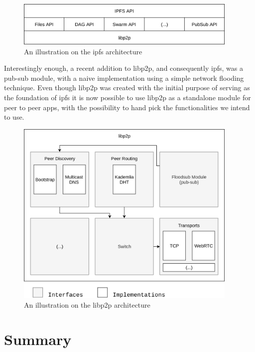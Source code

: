 \begin{figure}[hb!]
  \centering
  \includegraphics[width=0.95\textwidth]{../images/ipfs-stack.png}
  \caption{An illustration on the \acrshort{ipfs} architecture}
  \label{fig:ipfs-stack}
\end{figure}

Interestingly enough, a recent addition to libp2p, and consequently \acrshort{ipfs}, was a
pub-sub module, with a naive implementation using a simple network flooding
technique. Even though libp2p was created with the initial purpose of serving
as the foundation of \acrshort{ipfs} it is now possible to use libp2p as a standalone
module for peer to peer apps, with the possibility to hand pick the
functionalities we intend to use.

\begin{figure}[hb!]
  \centering
  \includegraphics[width=0.95\textwidth]{../images/libp2p-arch.png}
  \caption{An illustration on the libp2p architecture}
  \label{fig:ipfs-arch}
\end{figure}

\section{Summary}\label{summary}

